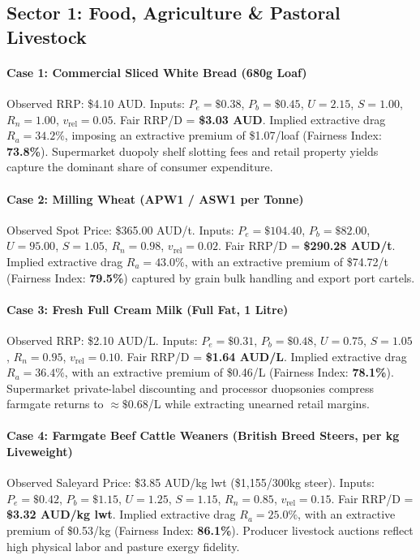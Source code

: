 \documentclass[preprint,12pt,authoryear]{elsarticle}
\begin{document}
\subsection{Sector 1: Food, Agriculture \& Pastoral Livestock}
\paragraph{Case 1: Commercial Sliced White Bread (680g Loaf)}
Observed RRP: \$4.10 AUD. Inputs: $P_e = \$0.38$, $P_b = \$0.45$, $U = 2.15$, $S = 1.00$, $R_n = 1.00$, $v_{\text{rel}} = 0.05$. Fair RRP/D = \textbf{\$3.03 AUD}. Implied extractive drag $R_a = \mathbf{34.2\%}$, imposing an extractive premium of \$1.07/loaf (Fairness Index: \textbf{73.8\%}). Supermarket duopoly shelf slotting fees and retail property yields capture the dominant share of consumer expenditure.

\paragraph{Case 2: Milling Wheat (APW1 / ASW1 per Tonne)}
Observed Spot Price: \$365.00 AUD/t. Inputs: $P_e = \$104.40$, $P_b = \$82.00$, $U = 95.00$, $S = 1.05$, $R_n = 0.98$, $v_{\text{rel}} = 0.02$. Fair RRP/D = \textbf{\$290.28 AUD/t}. Implied extractive drag $R_a = \mathbf{43.0\%}$, with an extractive premium of \$74.72/t (Fairness Index: \textbf{79.5\%}) captured by grain bulk handling and export port cartels.

\paragraph{Case 3: Fresh Full Cream Milk (Full Fat, 1 Litre)}
Observed RRP: \$2.10 AUD/L. Inputs: $P_e = \$0.31$, $P_b = \$0.48$, $U = 0.75$, $S = 1.05$, $R_n = 0.95$, $v_{\text{rel}} = 0.10$. Fair RRP/D = \textbf{\$1.64 AUD/L}. Implied extractive drag $R_a = \mathbf{36.4\%}$, with an extractive premium of \$0.46/L (Fairness Index: \textbf{78.1\%}). Supermarket private-label discounting and processor duopsonies compress farmgate returns to $\approx \$0.68$/L while extracting unearned retail margins.

\paragraph{Case 4: Farmgate Beef Cattle Weaners (British Breed Steers, per kg Liveweight)}
Observed Saleyard Price: \$3.85 AUD/kg lwt (\$1,155/300kg steer). Inputs: $P_e = \$0.42$, $P_b = \$1.15$, $U = 1.25$, $S = 1.15$, $R_n = 0.85$, $v_{\text{rel}} = 0.15$. Fair RRP/D = \textbf{\$3.32 AUD/kg lwt}. Implied extractive drag $R_a = \mathbf{25.0\%}$, with an extractive premium of \$0.53/kg (Fairness Index: \textbf{86.1\%}). Producer livestock auctions reflect high physical labor and pasture exergy fidelity.
\end{document}
